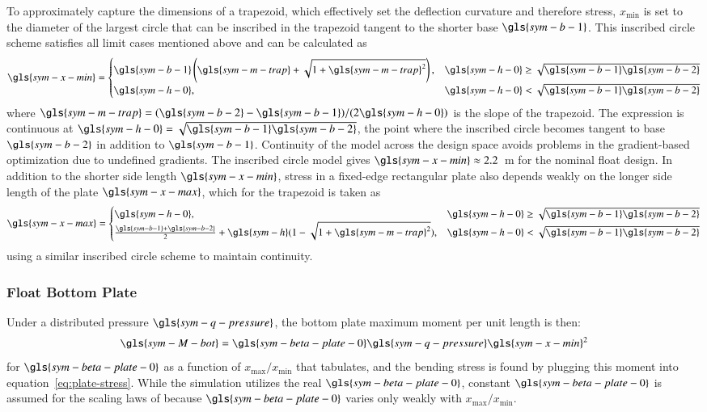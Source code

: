 To approximately capture the dimensions of a trapezoid, which effectively set the deflection curvature and therefore stress, $x_{\text{min}}$ is set to the diameter of the largest circle that can be inscribed in the trapezoid tangent to the shorter base $\gls{sym-b-1}$.
This inscribed circle scheme satisfies all limit cases mentioned above and can be calculated as
\begin{equation}
    \gls{sym-x-min} =
    \begin{cases}
        \gls{sym-b-1} \left( \gls{sym-m-trap} + \sqrt{1+\gls{sym-m-trap}^2}\right), & \gls{sym-h-0} \geq \sqrt{\gls{sym-b-1}\gls{sym-b-2}}
        \\
        \gls{sym-h-0}, & \gls{sym-h-0} < \sqrt{\gls{sym-b-1}\gls{sym-b-2}}
    \end{cases}
\end{equation}
where $\gls{sym-m-trap}=(\gls{sym-b-2}-\gls{sym-b-1})/(2\gls{sym-h-0})$ is the slope of the trapezoid.
The expression is continuous at $\gls{sym-h-0}=\sqrt{\gls{sym-b-1}\gls{sym-b-2}}$, the point where the inscribed circle becomes tangent to base $\gls{sym-b-2}$ in addition to $\gls{sym-b-1}$.
Continuity of the model across the design space avoids problems in the gradient-based optimization due to undefined gradients.
The inscribed circle model gives $\gls{sym-x-min}\approx2.2$~m for the nominal float design.
In addition to the shorter side length $\gls{sym-x-min}$, stress in a fixed-edge rectangular plate also depends weakly on the longer side length of the plate $\gls{sym-x-max}$, which for the trapezoid is taken as
\begin{equation}
    \gls{sym-x-max} =
    \begin{cases}
        \gls{sym-h-0},& \gls{sym-h-0} \geq \sqrt{\gls{sym-b-1}\gls{sym-b-2}}
        \\
        \frac{\gls{sym-b-1}+\gls{sym-b-2}}{2} + \gls{sym-h}(1-\sqrt{1+\gls{sym-m-trap}^2}), & \gls{sym-h-0} < \sqrt{\gls{sym-b-1} \gls{sym-b-2}}
    \end{cases}
\end{equation}
using a similar inscribed circle scheme to maintain continuity.

\subsubsection{Float Bottom Plate}
Under a distributed pressure $\gls{sym-q-pressure}$, the bottom plate maximum moment per unit length is then:
\begin{equation}\label{eq:bottom-plate-moment}
\gls{sym-M-bot}=\gls{sym-beta-plate-0} \gls{sym-q-pressure} \gls{sym-x-min}^2
\end{equation}
for $\gls{sym-beta-plate-0}$ as a function of $x_{\text{max}}/x_{\text{min}}$ that \citet{timoshenko_theory_1959} tabulates, and the bending stress is found by plugging this moment into equation~\eqref{eq:plate-stress}.
While the simulation utilizes the real $\gls{sym-beta-plate-0}$, constant $\gls{sym-beta-plate-0}$ is assumed for the scaling laws of  because $\gls{sym-beta-plate-0}$ varies only weakly with $x_{\text{max}}/x_{\text{min}}$.

